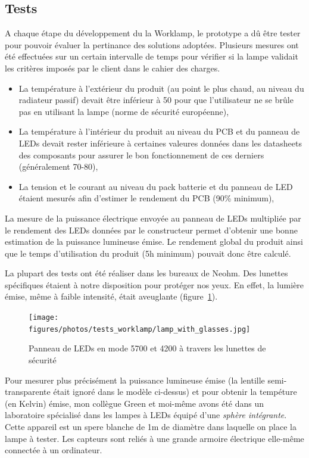 \documentclass[a4paper, 11pt]{report}
\begin{document}
\subsection{Tests}
A chaque étape du développement du la Worklamp, le prototype a dû  être tester pour pouvoir évaluer la pertinance des solutions adoptées. Plusieurs mesures ont été effectuées sur un certain intervalle de temps pour vérifier si la lampe validait les critères imposés par le client dans le cahier des charges.
\begin{itemize} %
\item La température à l'extérieur du produit (au point le plus chaud, au niveau du radiateur passif) devait être inférieur à \unit{50}{\celsius} pour que l'utilisateur ne se brûle pas en utilisant la lampe (norme de sécurité européenne),
\item La température à l'intérieur du produit au niveau du PCB et du panneau de LEDs devait rester inférieure à certaines valeures données dans les datasheets des composants pour assurer le bon fonctionnement de ces derniers (généralement 70-80\celsius),
\item La tension et le courant au niveau du pack batterie et du panneau de LED étaient mesurés afin d'estimer le rendement du PCB (90\% minimum),
\end{itemize}
La mesure de la puissance électrique envoyée au panneau de LEDs multipliée par le rendement des LEDs données par le constructeur permet d'obtenir une bonne estimation de la puissance lumineuse émise. Le rendement global du produit ainsi que le temps d'utilisation du produit (5h minimum) pouvait donc être calculé.

La plupart des tests ont été réaliser dans les bureaux de Neohm. Des lunettes spécifiques étaient à notre disposition pour protéger nos yeux. En effet, la lumière émise, même à faible intensité, était aveuglante (figure~\ref{fig:lamp_with_glasses}).

\begin{figure}[!h]
\begin{center}
\texttt{[image: figures/photos/tests\_worklamp/lamp\_with\_glasses.jpg]}
\end{center}
\caption{Panneau de LEDs en mode \unit{5700}{\kelvin} et \unit{4200}{\kelvin} à travers les lunettes de sécurité}
\label{fig:lamp_with_glasses}
\end{figure}

Pour mesurer plus précisément la puissance lumineuse émise (la lentille semi-transparente était ignoré dans le modèle ci-dessus) et pour obtenir la tempéture (en Kelvin) émise, mon collègue Green et moi-même avons été dans un laboratoire spécialisé dans les lampes à LEDs équipé d'une \emph{sphère intégrante}. Cette appareil est un spere blanche de 1m de diamètre dans laquelle on place la lampe à tester. Les capteurs sont reliés à une grande armoire électrique elle-même connectée à un ordinateur.
\end{document}
